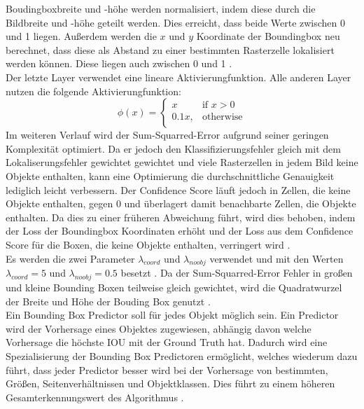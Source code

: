 {{	Boudingboxbreite und -höhe werden normalisiert, indem diese durch die Bildbreite und -höhe geteilt werden. Dies erreicht, dass beide Werte zwischen 0 und 1 liegen. Außerdem werden die $x$ und $y$ Koordinate der Boundingbox neu berechnet, dass diese als Abstand zu einer bestimmten Rasterzelle lokalisiert werden können. Diese liegen auch zwischen 0 und 1 \citep{Plastiras2018}. \\
	Der letzte Layer verwendet eine lineare Aktivierungfunktion. Alle anderen Layer nutzen die folgende Aktivierungfunktion: 
	\begin{equation}
		\phi(x) = \begin{cases}
			x & \text{if $x > 0$} \\
			0.1x, & \text{otherwise} \\
		\end{cases}
	\end{equation} 
	Im weiteren Verlauf wird der Sum-Squarred-Error aufgrund seiner geringen Komplexität optimiert. Da er jedoch den Klassifizierungsfehler gleich mit dem Lokaliserungsfehler gewichtet gewichtet und viele Rasterzellen in jedem Bild keine Objekte enthalten, kann eine Optimierung die durchschnittliche Genauigkeit lediglich leicht verbessern. Der Confidence Score läuft jedoch in Zellen, die keine Objekte enthalten, gegen 0 und überlagert damit benachbarte Zellen, die Objekte enthalten. Da dies zu einer früheren Abweichung  führt, wird dies behoben, indem der Loss der Boundingbox Koordinaten erhöht und der Loss aus dem Confidence Score für die Boxen, die keine Objekte enthalten, verringert wird \citep{Plastiras2018}. \\
	Es werden die zwei Parameter $\lambda_{coord}$ und $\lambda_{noobj}$ verwendet und  mit den Werten  $\lambda_{coord} = 5$ und $\lambda_{noobj} = 0.5$ besetzt \citep{Plastiras2018}.
	Da der Sum-Squarred-Error Fehler in großen und kleine Bounding Boxen teilweise gleich gewichtet, wird die Quadratwurzel der Breite und Höhe der Bouding Box genutzt \citep{Plastiras2018}. \\
	Ein Bounding Box Predictor soll für jedes Objekt möglich sein. Ein Predictor wird  der Vorhersage eines Objektes zugewiesen, abhängig davon welche Vorhersage die höchste IOU mit der Ground Truth hat. Dadurch wird eine Spezialisierung der Bounding Box Predictoren ermöglicht, welches wiederum dazu führt, dass jeder Predictor besser wird bei der Vorhersage von bestimmten, Größen, Seitenverhältnissen und Objektklassen. Dies führt zu einem höheren Gesamterkennungswert des Algorithmus \citep{Plastiras2018}. \\
}}
